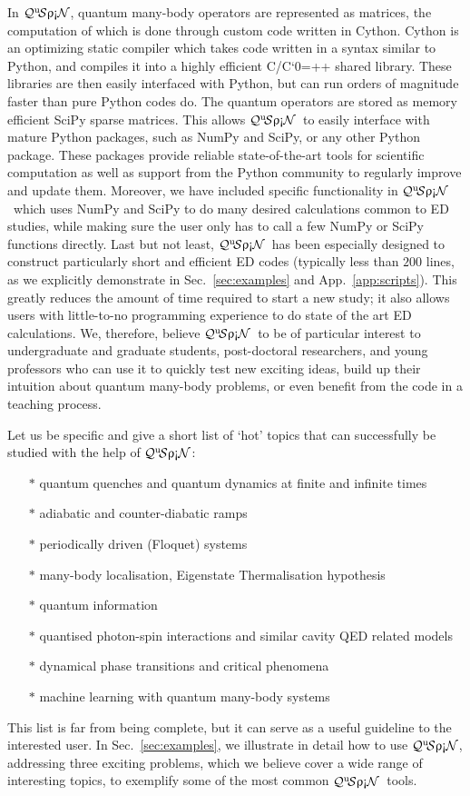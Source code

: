 \documentclass{SciPost}
\newcommand\0{\scalebox{-1}[1]{0}}
\let\svttfamily\ttfamily
\renewcommand\ttfamily{\svttfamily\catcode`0=\active }
\renewcommand\texttt{\bgroup\ttfamily\texttthelp}
\def\texttthelp#1{#1\egroup}
\newcommand{\qspin}{$\mathcal{Q}^{\mathrm{u}}\!\mathcal{S}\uprho\mathrm{\text{\textexclamdown}}\mathcal{N}$}
\begin{document}
In \qspin, quantum many-body operators are represented as matrices, the computation of which is done through custom code written in Cython. Cython is an optimizing static compiler which takes code written in a syntax similar to Python, and compiles it into a highly efficient C/C\texttt{++} shared library. These libraries are then easily interfaced with Python, but can run orders of magnitude faster than pure Python codes do\cite{Cython}. The quantum operators are stored as memory efficient SciPy sparse matrices. This allows \qspin\ to easily interface with mature Python packages, such as NumPy and SciPy, or any other Python package. These packages provide reliable state-of-the-art tools for scientific computation as well as support from the Python community to regularly improve and update them\cite{NumPy,Python_computing_1,Python_computing_2,SciPy_package}. Moreover, we have included specific functionality in \qspin\ which uses NumPy and SciPy to do many desired calculations common to ED studies, while making sure the user only has to call a few NumPy or SciPy functions directly. Last but not least, \qspin\ has been especially designed to construct particularly short and efficient ED codes (typically less than $200$ lines, as we explicitly demonstrate in Sec.~\ref{sec:examples} and App.~\ref{app:scripts}). This greatly reduces the amount of time required to start a new study; it also allows users with little-to-no programming experience to do state of the art ED calculations. We, therefore, believe \qspin\ to be of particular interest to undergraduate and graduate students, post-doctoral researchers, and young professors who can use it to quickly test new exciting ideas, build up their intuition about quantum many-body problems, or even benefit from the code in a teaching process.

Let us be specific and give a short list of `hot' topics that can successfully be studied with the help of \qspin:
\begin{itemize}
	\item[$\ast$] quantum quenches and quantum dynamics at finite and infinite times
	\item[$\ast$] adiabatic and counter-diabatic ramps 
	\item[$\ast$] periodically driven (Floquet) systems
	\item[$\ast$] many-body localisation, Eigenstate Thermalisation hypothesis
	\item[$\ast$] quantum information
	\item[$\ast$] quantised photon-spin interactions and similar cavity QED related models
	\item[$\ast$] dynamical phase transitions and critical phenomena
	\item[$\ast$] machine learning with quantum many-body systems
\end{itemize}
This list is far from being complete, but it can serve as a useful guideline to the interested user. In Sec.~\ref{sec:examples}, we illustrate in detail how to use \qspin, addressing three exciting problems, which we believe cover a wide range of interesting topics, to exemplify some of the most common \qspin\ tools. 
\end{document}
